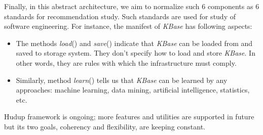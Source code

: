 \documentclass[a4paper]{llncs}
\begin{document}
Finally, in this abstract architecture, we aim to normalize such 6 components as 6 standards for recommendation study. Such standards are used for study of software engineering. For instance, the manifest of \textit{KBase} has following aspects:
\begin{itemize}
\item The methods \textit{load}() and \textit{save}() indicate that \textit{KBase} can be loaded from and saved to storage system. They don't specify how to load and store \textit{KBase}. In other words, they are rules with which the infrastructure must comply.
\item Similarly, method \textit{learn}() tells us that \textit{KBase} can be learned by any approaches: machine learning, data mining, artificial intelligence, statistics, etc.
\end{itemize}
Hudup framework is ongoing; more features and utilities are supported in future but its two goals, coherency and flexibility, are keeping constant.
\end{document}
